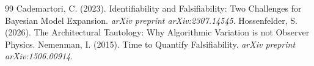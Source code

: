 \documentclass[12pt,a4paper]{article}
\begin{document}
\begin{thebibliography}{99}
 Cademartori, C. (2023). Identifiability and Falsifiability: Two Challenges for Bayesian Model Expansion. \emph{arXiv preprint arXiv:2307.14545}.
 Hossenfelder, S. (2026). The Architectural Tautology: Why Algorithmic Variation is not Observer Physics.
 Nemenman, I. (2015). Time to Quantify Falsifiability. \emph{arXiv preprint arXiv:1506.00914}.
\end{thebibliography}
\end{document}
